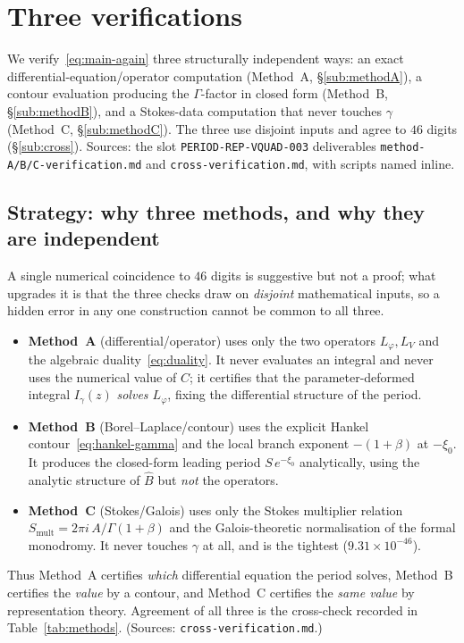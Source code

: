 \documentclass[11pt,reqno]{amsart}
\theoremstyle{plain}
\theoremstyle{definition}
\newcommand{\Bhat}{\widehat{B}}
\newcommand{\Lphi}{L_{\varphi}}
\newcommand{\LV}{L_{V}}
\newcommand{\xizero}{\xi_0}
\providecommand{\C}{}\renewcommand{\C}{C}
\begin{document}
\section{Three verifications}\label{sec:verif}

We verify~\eqref{eq:main-again} three structurally independent ways: an exact
differential-equation/operator computation (Method~A, \S\ref{sub:methodA}), a contour evaluation
producing the $\Gamma$-factor in closed form (Method~B, \S\ref{sub:methodB}), and a Stokes-data
computation that never touches $\gamma$ (Method~C, \S\ref{sub:methodC}). The three use disjoint
inputs and agree to $46$ digits (\S\ref{sub:cross}). Sources: the slot
\texttt{PERIOD-REP-VQUAD-003} deliverables \texttt{method-A/B/C-verification.md} and
\texttt{cross-verification.md}, with scripts named inline.

\subsection{Strategy: why three methods, and why they are independent}\label{sub:strategy}
A single numerical coincidence to $46$ digits is suggestive but not a proof; what upgrades it is
that the three checks draw on \emph{disjoint} mathematical inputs, so a hidden error in any one
construction cannot be common to all three.
\begin{itemize}[leftmargin=1.6em]
\item \textbf{Method~A} (differential/operator) uses only the two operators $\Lphi,\LV$ and the
algebraic duality~\eqref{eq:duality}. It never evaluates an integral and never uses the numerical
value of $\C$; it certifies that the parameter-deformed integral $I_\gamma(z)$ \emph{solves
$\Lphi$}, fixing the differential structure of the period.
\item \textbf{Method~B} (Borel--Laplace/contour) uses the explicit Hankel
contour~\eqref{eq:hankel-gamma} and the local branch exponent $-(1+\beta)$ at $-\xizero$. It
produces the closed-form leading period $S\,e^{-\xizero}$ analytically, using the analytic
structure of $\Bhat$ but \emph{not} the operators.
\item \textbf{Method~C} (Stokes/Galois) uses only the Stokes multiplier relation
$S_{\mathrm{mult}}=2\pi i\,A/\Gamma(1+\beta)$ and the Galois-theoretic normalisation of the
formal monodromy. It never touches $\gamma$ at all, and is the tightest ($9.31\times10^{-46}$).
\end{itemize}
Thus Method~A certifies \emph{which} differential equation the period solves, Method~B certifies
the \emph{value} by a contour, and Method~C certifies the \emph{same value} by representation
theory. Agreement of all three is the cross-check recorded in Table~\ref{tab:methods}. (Sources:
\texttt{cross-verification.md}.)
\end{document}
